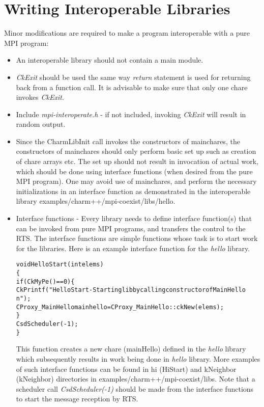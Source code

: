 \section{Writing Interoperable \charmpp{} Libraries}
Minor modifications are required to make a \charmpp{} program interoperable with a pure
MPI program:
\begin{itemize}
\item An interoperable \charmpp{} library should not contain a main module.
\item {\em CkExit} should be used the same way {\em return} statement is used for returning
back from a function call. It is advisable to make sure that only one chare
invokes {\em CkExit}.
\item Include {\em mpi-interoperate.h} - if not included, invoking {\em CkExit} will result 
in random output.
\item Since the CharmLibInit call invokes the constructors of mainchares, the
constructors of mainchares should only perform basic set up such as creation of chare
arrays etc. The set up should not result in invocation of actual work, which
should be done using interface functions (when desired from the pure MPI
program). One may avoid use of mainchares, and perform the necessary
initializations in an interface function as demonstrated in the interoperable
library examples/charm++/mpi-coexist/libs/hello.
\item Interface functions - Every library needs to define interface function(s) 
that can be invoked from pure MPI programs, and transfers the control to the 
\charmpp{} RTS. The interface functions are simple functions whose task is to
start work for the \charmpp{} libraries. Here is an example interface function for the
{\em hello} library. 
\begin{alltt}
void HelloStart(int elems)
\{
  if(CkMyPe() == 0) \{
  CkPrintf("HelloStart - Starting lib by calling constructor of MainHello\\n");
  CProxy\_MainHello mainhello = CProxy\_MainHello::ckNew(elems);
  \}
  CsdScheduler(-1);
\}
\end{alltt}

This function creates a new chare (mainHello) defined in the {\em hello} library which
subsequently results in work being done in {\em hello} library.
More examples of such interface functions can 
be found in hi (HiStart) and kNeighbor (kNeighbor) directories in 
examples/charm++/mpi-coexist/libs. Note that a scheduler call {\em
CsdScheduler(-1)} should be made from the interface functions to start the
message reception by \charmpp{} RTS.
\end{itemize}

